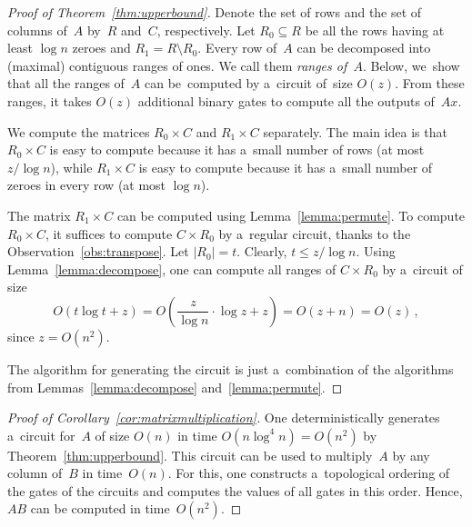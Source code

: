 \documentclass{toc}
\begin{document}
\begin{proof}[Proof of Theorem~\ref{thm:upperbound}]
Denote the set of rows and the set of columns of~$A$ by~$R$
and~$C$, respectively. Let $R_0 \subseteq R$ be all the rows
having at least $\log n$ zeroes and $R_1=R \setminus R_0$.
Every row of~$A$ can be decomposed into (maximal) contiguous ranges of ones. We
call them \emph{ranges of~$A$}.
Below, we~show that all the ranges of~$A$
can be~computed by a~circuit of~size $O(z)$.
From these
ranges, it takes $O(z)$ additional binary gates to compute all the outputs of~$Ax$.


We compute the matrices $R_0 \times C$ and $R_1 \times C$
separately. The main idea is that $R_0 \times C$ is easy to compute
because it has a~small number of rows (at most $z/\log n$), while $R_1 \times C$
is easy to compute because it has a~small number of zeroes in every row (at most
$\log n$).

The matrix $R_1 \times C$ can be computed using Lemma~\ref{lemma:permute}. To
compute $R_0 \times C$, it suffices to compute $C \times R_0$ by a~regular
circuit, thanks to the Observation~\ref{obs:transpose}.
Let $|R_0|=t$. Clearly, $t \le z/\log n$.
Using Lemma~\ref{lemma:decompose}, one can compute all
ranges of $C \times R_0$ by a~circuit of size
\[O(t\log t+z)=O\left(\frac{z}{\log n} \cdot \log z+z\right)=O(z+n)=O(z)\, ,\]
since $z =O(n^2)$.

The algorithm for generating the circuit is just a~combination
of the algorithms from Lemmas~\ref{lemma:decompose} and~\ref{lemma:permute}.
\end{proof}

\begin{proof}[Proof of Corollary~\ref{cor:matrixmultiplication}]
	One deterministically generates a~circuit for~$A$ of size $O(n)$ in time
	$O(n\log^4n)=O(n^2)$ by Theorem~\ref{thm:upperbound}.
	This circuit can be used to multiply~$A$ by any column of~$B$
	in time~$O(n)$. For this, one constructs a~topological ordering of the gates of
	the circuits and computes the values of all gates in this order. Hence, $AB$ can
	be computed in time~$O(n^2)$.
\end{proof}
\end{document}
